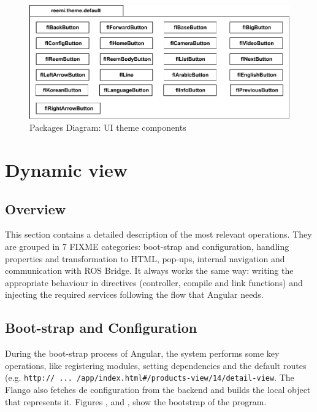 \begin{figure}[htb]
    \centering
    \includegraphics{figures/design-package-uithemecomponents.pdf}
    \caption{Packages Diagram: UI theme components}
    \label{fig:pkg-themecomponents}
\end{figure}

\FloatBarrier

\section{Dynamic view}
\subsection{Overview}
This section contains a detailed description of the most relevant operations.
They are grouped in 7 FIXME categories: boot-strap and configuration, handling properties and transformation to \ac{HTML}, pop-ups, internal navigation and communication with ROS Bridge.
It always works the same way: writing the appropriate behaviour in directives (controller, compile and link functions) and injecting the required services following the flow that Angular needs.

\subsection{Boot-strap and Configuration}
During the boot-strap process of Angular, the system performs some key operations, like registering modules, setting dependencies and the default routes (e.g. \texttt{http:// ... /app/index.html\#/products-view/14/detail-view}.
The Flango \cm also fetches de configuration from the backend and builds the local object that represents it.
Figures ,  and , show the bootstrap of the program.

